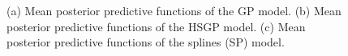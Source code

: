 \documentclass[]{interact}
\theoremstyle{plain}%
\theoremstyle{definition}
\theoremstyle{remark}
\begin{document}
\begin{figure}
\caption{(a) Mean posterior predictive functions of the GP model. (b) Mean posterior predictive functions of the HSGP model. (c) Mean posterior predictive functions of the splines (SP) model.}
  \label{fig18_gpfun_diabetes}
\end{figure}
\end{document}
